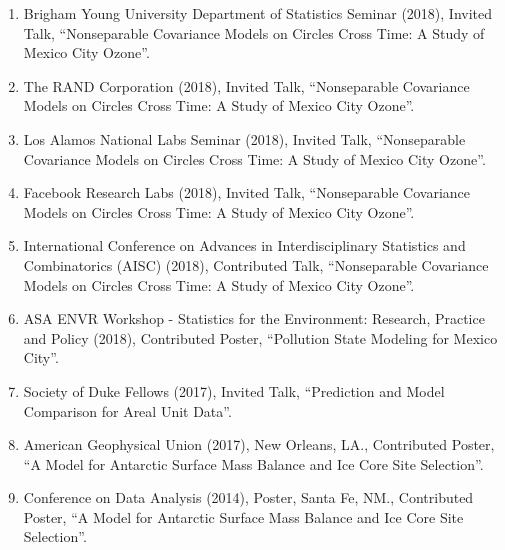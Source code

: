 \documentclass[11pt]{article}
\begin{document}
\begin{enumerate}[label=$\bullet$]
\item Brigham Young University Department of Statistics Seminar (2018), Invited Talk, ``Nonseparable Covariance Models on Circles Cross Time: A Study of Mexico City Ozone''.
\item The RAND Corporation (2018), Invited Talk, ``Nonseparable Covariance Models on Circles Cross Time: A Study of Mexico City Ozone''.
\item Los Alamos National Labs Seminar (2018), Invited Talk, ``Nonseparable Covariance Models on Circles Cross Time: A Study of Mexico City Ozone''.
\item Facebook Research Labs (2018), Invited Talk, ``Nonseparable Covariance Models on Circles Cross Time: A Study of Mexico City Ozone''.
\item International Conference on Advances in Interdisciplinary Statistics and Combinatorics (AISC) (2018), Contributed Talk, ``Nonseparable Covariance Models on Circles Cross Time: A Study of Mexico City Ozone''.
\item ASA ENVR Workshop - Statistics for the Environment: Research, Practice and Policy (2018), Contributed Poster, ``Pollution State Modeling for Mexico City''.

\item Society of Duke Fellows (2017), Invited Talk, ``Prediction and Model Comparison for Areal Unit Data''.
\item American Geophysical Union (2017), New Orleans, LA., Contributed Poster, ``A Model for Antarctic Surface Mass Balance and Ice Core Site Selection''. 

\item Conference on Data Analysis (2014), Poster, Santa Fe, NM., Contributed Poster, ``A Model for Antarctic Surface Mass Balance and Ice Core Site Selection''. 



\end{enumerate}
\end{document}
